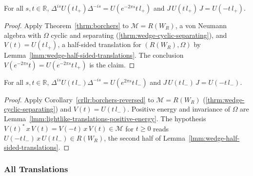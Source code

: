 \begin{lemma}
    \label{lmm:wedge-modular-plus}
    \leanok
    For all $s, t \in \mathbb{R}$, $\Delta^{is}U(t\,l_+)\Delta^{-is} = U(e^{-2\pi s}t\,l_+)$ and $J\,U(t\,l_+)\,J = U(-t\,l_+)$.
\end{lemma}
\begin{proof}
    \leanok
    Apply Theorem~\ref{thrm:borchers} to $\mathcal{M} = R(W_R)$, a von Neumann algebra with $\Omega$ cyclic and separating (\ref{thrm:wedge-cyclic-separating}), and $V(t) = U(t\,l_+)$, a half-sided translation for $(R(W_R), \Omega)$ by Lemma~\ref{lmm:wedge-half-sided-translations}. The conclusion $V(e^{-2\pi s}t) = U(e^{-2\pi s}t\,l_+)$ is the claim.
\end{proof}

\begin{lemma}
    \label{lmm:wedge-modular-minus}
    \leanok
    For all $s, t \in \mathbb{R}$, $\Delta^{is}U(t\,l_-)\Delta^{-is} = U(e^{2\pi s}t\,l_-)$ and $J\,U(t\,l_-)\,J = U(-t\,l_-)$.
\end{lemma}
\begin{proof}
    \leanok
    Apply Corollary~\ref{crllr:borchers-reversed} to $\mathcal{M} = R(W_R)$ (\ref{thrm:wedge-cyclic-separating}) and $V(t) = U(t\,l_-)$. Positive energy and invariance of $\Omega$ are Lemma~\ref{lmm:lightlike-translations-positive-energy}. The hypothesis $V(t)^*\,x\,V(t) = V(-t)\,x\,V(t) \in \mathcal{M}$ for $t \ge 0$ reads $U(-t\,l_-)\,x\,U(t\,l_-) \in R(W_R)$, the second half of Lemma~\ref{lmm:wedge-half-sided-translations}.
\end{proof}

\subsubsection{All Translations}

